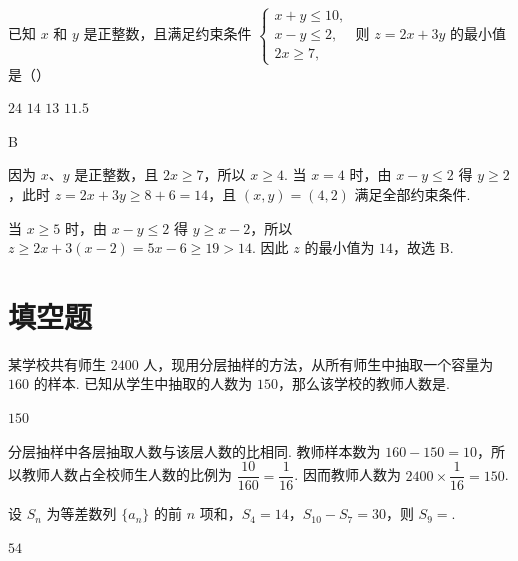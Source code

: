 \begin{problem}
已知 \(x\) 和 \(y\) 是正整数，且满足约束条件 \(\begin{cases}
x + y \leqslant 10,\\
x - y \leqslant 2,\\
2x \geqslant 7,
\end{cases}\) 则 \(z = 2x + 3y\) 的最小值是（\quad）

\choices
    {\(24\)}
    {\(14\)}
    {\(13\)}
    {\(11.5\)}
\end{problem}

\begin{answer}
B
\end{answer}

\begin{solution}
因为 \(x\)、\(y\) 是正整数，且 \(2x\geqslant7\)，所以 \(x\geqslant4\). 当 \(x=4\) 时，由 \(x-y\leqslant2\) 得 \(y\geqslant2\)，此时 \(z=2x+3y\geqslant8+6=14\)，且 \((x,y)=(4,2)\) 满足全部约束条件.

当 \(x\geqslant5\) 时，由 \(x-y\leqslant2\) 得 \(y\geqslant x-2\)，所以 \(z\geqslant2x+3(x-2)=5x-6\geqslant19>14\). 因此 \(z\) 的最小值为 \(14\)，故选 B.
\end{solution}

\section{填空题}
\begin{problem}
某学校共有师生 \(2400\text{ 人}\)，现用分层抽样的方法，从所有师生中抽取一个容量为 \(160\) 的样本. 已知从学生中抽取的人数为 \(150\)，那么该学校的教师人数是\fillinblank{}.
\end{problem}

\begin{answer}
\(150\)
\end{answer}

\begin{solution}
分层抽样中各层抽取人数与该层人数的比相同. 教师样本数为 \(160-150=10\)，所以教师人数占全校师生人数的比例为 \(\dfrac{10}{160}=\dfrac{1}{16}\). 因而教师人数为 \(2400\times\dfrac{1}{16}=150\).
\end{solution}

\begin{problem}
设 \(S_{n}\) 为等差数列 \(\{a_{n}\}\) 的前 \(n\) 项和，\(S_{4} = 14\)，\(S_{10} - S_{7} = 30\)，则 \(S_{9} = \)\fillinblank{}.
\end{problem}

\begin{answer}
\(54\)
\end{answer}

